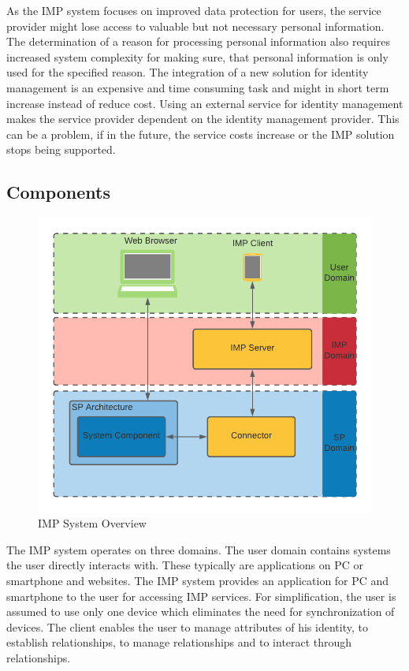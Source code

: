 As the IMP system focuses on improved data protection for users, the service provider might lose access to valuable but not necessary personal information. The determination of a reason for processing personal information also requires increased system complexity for making sure, that personal information is only used for the specified reason. The integration of a new solution for identity management is an expensive and time consuming task and might in short term increase instead of reduce cost. Using an external service for identity management makes the service provider dependent on the identity management provider. This can be a problem, if in the future, the service costs increase or the IMP solution stops being supported.

\subsection{Components}

\begin{figure}[h]
\caption{IMP System Overview}
    \centering
    \includegraphics[scale=0.25]{Diagrams/IMP System Overview.png}
\end{figure}

The IMP system operates on three domains. The user domain contains systems the user directly interacts with. These typically are applications on PC or smartphone and websites. The IMP system provides an application for PC and smartphone to the user for accessing IMP services. For simplification, the user is assumed to use only one device which eliminates the need for synchronization of devices. The client enables the user to manage attributes of his identity, to establish relationships, to manage relationships and to interact through relationships. 

